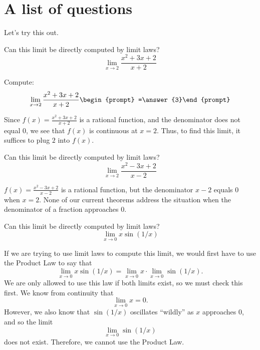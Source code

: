 \documentclass{ximera}
\begin{document}
\section{A list of questions}

Let's try this out.

\begin{question}
  Can this limit be directly computed by limit laws?
  \[
  \displaystyle\lim_{x\to 2}\frac{x^2+3x+2}{x+2} 
  \]
  \begin{multipleChoice}
  \end{multipleChoice}
  \begin{question}
    Compute:
    \[
    \displaystyle\lim_{x\to 2}\frac{x^2+3x+2}{x+2}\begin{prompt} =\answer{3}\end{prompt}
    \]
    \begin{feedback}
      Since $f(x)=\frac{x^2+3x+2}{x+2}$ is a rational function, and
      the denominator does not equal $0$, we see that $f(x)$ is
      continuous at $x=2$.  Thus, to find this limit, it suffices to
      plug $2$ into $f(x)$.
    \end{feedback}
  \end{question}
\end{question}


\begin{question}
  Can this limit be directly computed by limit laws?
  \[
  \displaystyle\lim_{x\to 2}\frac{x^2-3x+2}{x-2}
  \]
  \begin{multipleChoice}
  \end{multipleChoice}
  \begin{feedback}
    $f(x) = \frac{x^2-3x+2}{x-2}$ is a rational function, but the
    denominator $x-2$ equals $0$ when $x=2$. None of our current
    theorems address the situation when the denominator of a fraction
    approaches $0$.
  \end{feedback}
\end{question}


\begin{question}
  Can this limit be directly computed by limit laws?
  \[
  \displaystyle\lim_{x\to 0} x\sin(1/x)
  \]
  \begin{multipleChoice}
  \end{multipleChoice}
  \begin{feedback}
    If we are trying to use limit laws to compute this limit, we would
    first have to use the Product Law to say that
    \[
    \displaystyle\lim_{x\to 0}x\sin(1/x)= \lim_{x\to 0} x \cdot \lim_{x\to 0} \sin(1/x).
    \]
    We are only allowed to use this law if both limits exist, so we
    must check this first.  We know from continuity that
    \[
    \displaystyle\lim_{x\to  0}x=0.
    \]
    However, we also know that $\sin(1/x)$ oscillates ``wildly'' as
    $x$ approaches $0$, and so the limit
    \[
    \lim_{x\to 0} \sin(1/x)
    \]does not exist.  Therefore, we cannot use the
    Product Law.
  \end{feedback}
\end{question}
\end{document}
